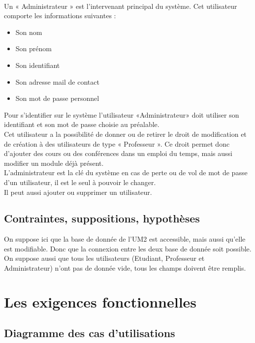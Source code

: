 \documentclass[a4paper, 11pt]{article}
\begin{document}
\\Un « Administrateur » est l'intervenant principal du système. Cet utilisateur comporte les informations suivantes :
        \begin{itemize}
        \item Son nom
        \item Son prénom
        \item Son identifiant
        \item Son adresse mail de contact
        \item Son mot de passe personnel
        \end{itemize}
Pour s'identifier sur le système l'utilisateur «Administrateur» doit utiliser son identifiant et son mot de passe choisie au préalable.\\Cet utilisateur a la possibilité de donner ou de retirer le droit de modification et de création à des utilisateurs de type « Professeur ». Ce droit permet donc d'ajouter des cours ou des conférences dans un emploi du temps, mais aussi modifier un module déjà présent.\\L'administrateur est la clé du système en cas de perte ou de vol de mot de passe d'un utilisateur, il est le seul à pouvoir le changer.\\Il peut aussi ajouter ou supprimer un utilisateur.
        \subsection{ Contraintes, suppositions, hypothèses}
        On suppose ici que la base de donnée de l'UM2 est accessible, mais aussi qu'elle est modifiable. Donc que la connexion entre les deux base de donnée soit possible.\\On suppose aussi que tous les utilisateurs (Etudiant, Professeur et Administrateur) n'ont pas de donnée vide, tous les champs doivent être remplis.
        \clearpage
        \section{ Les exigences fonctionnelles}
        \subsection{ Diagramme des cas d'utilisations}
\end{document}
